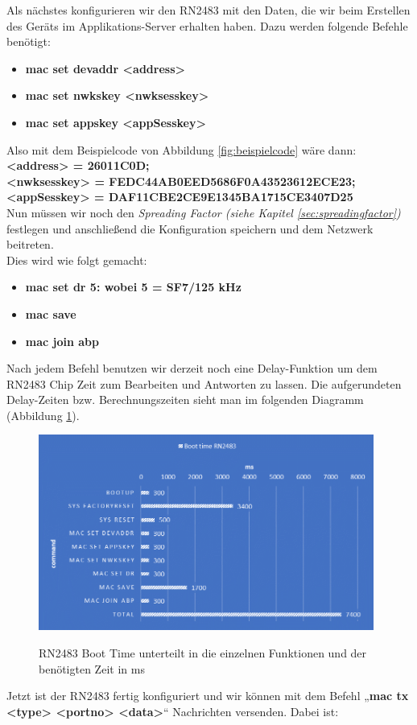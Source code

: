 \noindent
Als nächstes konfigurieren wir den RN2483 mit den Daten, die wir beim Erstellen des Geräts im Applikations-Server erhalten haben. Dazu werden folgende Befehle benötigt:
\begin{itemize}
    \item \textbf{mac set devaddr <address>}
    \item \textbf{mac set nwkskey <nwksesskey>}
    \item \textbf{mac set appskey <appSesskey>}
\end{itemize}
Also mit dem Beispielcode von Abbildung \ref{fig:beispielcode} wäre dann:\\
\textbf{<address> = 26011C0D;}\\
\textbf{<nwksesskey> = FEDC44AB0EED5686F0A43523612ECE23;}\\
\textbf{<appSesskey> = DAF11CBE2CE9E1345BA1715CE3407D25}\\

\noindent
Nun müssen wir noch den \textit{Spreading Factor (siehe Kapitel \ref{sec:spreadingfactor})} festlegen und anschließend die Konfiguration speichern und dem Netzwerk beitreten.\\
Dies wird wie folgt gemacht: 

\begin{itemize}
    \item \textbf{mac set dr 5: wobei 5 = SF7/125 kHz}
    \item \textbf{mac save}
    \item \textbf{mac join abp}
\end{itemize}

\noindent
Nach jedem Befehl benutzen wir derzeit noch eine Delay-Funktion um dem RN2483 Chip Zeit zum Bearbeiten und Antworten zu lassen. Die aufgerundeten Delay-Zeiten bzw. Berechnungszeiten sieht man im folgenden Diagramm (Abbildung \ref{fig:boot-time}).

\begin{figure}[H]
    \center
    \includegraphics[width=11cm]{Bilder/lora-9.png}\\
    \caption{RN2483 Boot Time unterteilt in die einzelnen Funktionen und der benötigten Zeit in ms}
    \label{fig:boot-time}
\end{figure}
\noindent
Jetzt ist der RN2483 fertig konfiguriert und wir können mit dem Befehl „\textbf{mac tx <type> <portno> <data>}“ Nachrichten versenden. Dabei ist:\\

